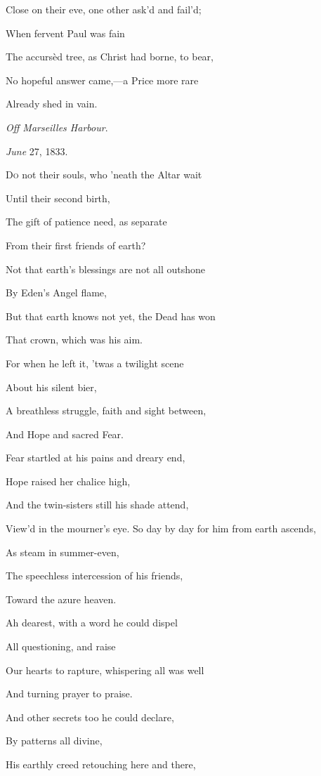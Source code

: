 Close on their eve, one other ask'd and fail'd;

When
fervent Paul was fain

The accursèd tree, as Christ had borne, to bear,

No hopeful answer came,—a Price more rare

Already shed in vain.

\emph{Off Marseilles Harbour}.

\emph{June} 27, 1833.


D\textsc{o} not their souls, who 'neath the Altar wait

Until their second birth,

The gift of patience need, as separate

From their first friends of earth?

Not that earth's blessings are not all outshone

By Eden's Angel flame,

But that earth knows not yet, the Dead has won

That crown, which was his aim.

For when he left it, 'twas a twilight scene

About his silent bier,

A breathless struggle, faith and sight between,

And Hope and sacred Fear.

Fear startled at his pains and dreary end,

Hope raised her chalice high,

And the twin-sisters still his shade attend,

View'd in the mourner's eye. So day by day for him from earth ascends,

As steam in summer-even,

The speechless intercession of his friends,

Toward the azure heaven.

Ah dearest, with a
word he could dispel

All questioning, and raise

Our hearts to rapture, whispering all was well

And turning prayer to praise.

And other secrets too he could declare,

By patterns all divine,

His earthly creed retouching here and there,

